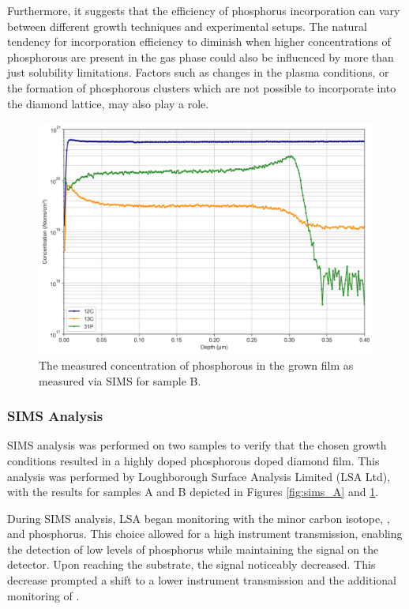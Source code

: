 Furthermore, it suggests that the efficiency of phosphorus incorporation can vary between different growth techniques and experimental setups. The natural tendency for incorporation efficiency to diminish when higher concentrations of phosphorous are present in the gas phase could also be influenced by more than just solubility limitations. Factors such as changes in the plasma conditions, or the formation of phosphorous clusters which are not possible to incorporate into the diamond lattice, may also play a role.

\begin{figure}[h]
\centering
\includegraphics[width=\textwidth]{SIMS Depth Profile 63A.png}
\caption{The measured concentration of phosphorous in the grown film as measured via SIMS for sample B.}
\label{fig:sims_B}
\end{figure}
\subsubsection{SIMS Analysis}

SIMS analysis was performed on two samples to verify that the chosen growth conditions resulted in a highly doped phosphorous doped diamond film. This analysis was performed by Loughborough Surface Analysis Limited (LSA Ltd), with the results for samples A and B depicted in Figures \ref{fig:sims_A} and \ref{fig:sims_B}.

During SIMS analysis, LSA began monitoring with the minor carbon isotope, , and phosphorus. This choice allowed for a high instrument transmission, enabling the detection of low levels of phosphorus while maintaining the  signal on the detector. Upon reaching the substrate, the  signal noticeably decreased. This decrease prompted a shift to a lower instrument transmission and the additional monitoring of .

